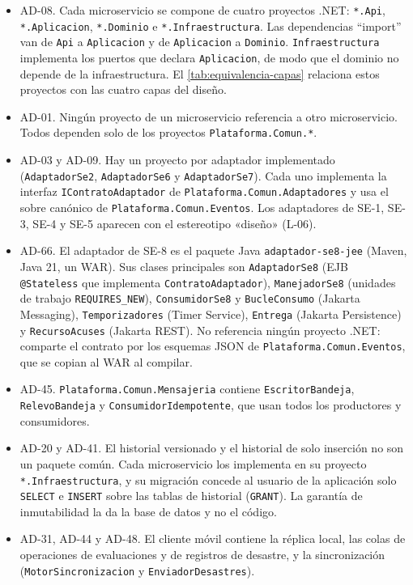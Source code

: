 \documentclass[11pt,letterpaper]{article}
\providecommand{\br}{\discretionary{}{}{}}
\begin{document}
\begin{itemize}
  \item AD-08. Cada microservicio se compone de cuatro proyectos .NET: \texttt{*.Api},
        \texttt{*.Aplicacion}, \texttt{*.Dominio} e \texttt{*.\br{}Infraestructura}. Las dependencias
        \enquote{import} van de \texttt{Api} a \texttt{Aplicacion} y de \texttt{Aplicacion} a
        \texttt{Dominio}. \texttt{Infraestructura} implementa los puertos que declara
        \texttt{Aplicacion}, de modo que el dominio no depende de la infraestructura. El
        \cref{tab:equivalencia-capas} relaciona estos proyectos con las cuatro capas del diseño.
  \item AD-01. Ningún proyecto de un microservicio referencia a otro microservicio. Todos dependen
        solo de los proyectos \texttt{Plataforma.\br{}Comun.\br{}*}.
  \item AD-03 y AD-09. Hay un proyecto por adaptador implementado (\texttt{AdaptadorSe2},
        \texttt{AdaptadorSe6} y \texttt{AdaptadorSe7}). Cada uno implementa la interfaz
        \texttt{IContratoAdaptador} de \texttt{Plataforma.\br{}Comun.\br{}Adaptadores} y usa el sobre
        canónico de \texttt{Plataforma.\br{}Comun.\br{}Eventos}. Los adaptadores de SE-1, SE-3, SE-4 y
        SE-5 aparecen con el estereotipo «diseño» (L-06).
  \item AD-66. El adaptador de SE-8 es el paquete Java \texttt{adaptador-\br{}se8-\br{}jee} (Maven, Java
        21, un WAR). Sus clases principales son \texttt{AdaptadorSe8} (EJB \texttt{@Stateless} que
        implementa \texttt{ContratoAdaptador}), \texttt{ManejadorSe8} (unidades de trabajo
        \texttt{REQUIRES\_NEW}), \texttt{ConsumidorSe8} y \texttt{BucleConsumo} (Jakarta Messaging),
        \texttt{Temporizadores} (Timer Service), \texttt{Entrega} (Jakarta Persistence) y
        \texttt{RecursoAcuses} (Jakarta REST). No referencia ningún proyecto .NET: comparte el
        contrato por los esquemas JSON de \texttt{Plataforma.\br{}Comun.\br{}Eventos}, que se copian al
        WAR al compilar.
  \item AD-45. \texttt{Plataforma.\br{}Comun.\br{}Mensajeria} contiene \texttt{EscritorBandeja},
        \texttt{RelevoBandeja} y \texttt{ConsumidorIdempotente}, que usan todos los productores y
        consumidores.
  \item AD-20 y AD-41. El historial versionado y el historial de solo inserción no son un paquete
        común. Cada microservicio los implementa en su proyecto \texttt{*.\br{}Infraestructura}, y su
        migración concede al usuario de la aplicación solo \texttt{SELECT} e \texttt{INSERT} sobre
        las tablas de historial (\texttt{GRANT}). La garantía de inmutabilidad la da la base de
        datos y no el código.
  \item AD-31, AD-44 y AD-48. El cliente móvil contiene la réplica local, las colas de operaciones
        de evaluaciones y de registros de desastre, y la sincronización (\texttt{MotorSincronizacion}
        y \texttt{EnviadorDesastres}).
\end{itemize}
\end{document}
